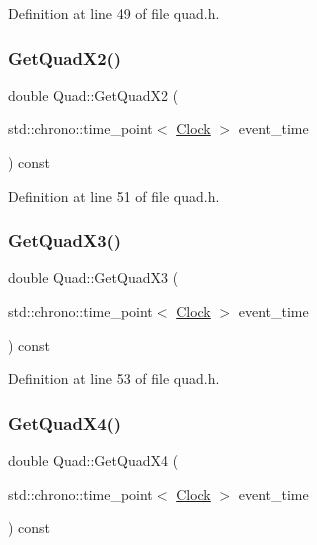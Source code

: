 Definition at line 49 of file quad.\+h.

\mbox{\label{class_quad_a2974623eaf17fe5bef35e8c4638149d6}} 
\subsubsection{\texorpdfstring{Get\+Quad\+X2()}{GetQuadX2()}}
{\footnotesize\ttfamily double Quad\+::\+Get\+Quad\+X2 (\begin{DoxyParamCaption}\item[{std\+::chrono\+::time\+\_\+point$<$ \mbox{\hyperlink{universe_8h_a0ef8d951d1ca5ab3cfaf7ab4c7a6fd80}{Clock}} $>$}]{event\+\_\+time }\end{DoxyParamCaption}) const\hspace{0.3cm}{\ttfamily [inline]}}



Definition at line 51 of file quad.\+h.

\mbox{\label{class_quad_aaa044d9683717efd054d82f553b3337d}} 
\subsubsection{\texorpdfstring{Get\+Quad\+X3()}{GetQuadX3()}}
{\footnotesize\ttfamily double Quad\+::\+Get\+Quad\+X3 (\begin{DoxyParamCaption}\item[{std\+::chrono\+::time\+\_\+point$<$ \mbox{\hyperlink{universe_8h_a0ef8d951d1ca5ab3cfaf7ab4c7a6fd80}{Clock}} $>$}]{event\+\_\+time }\end{DoxyParamCaption}) const\hspace{0.3cm}{\ttfamily [inline]}}



Definition at line 53 of file quad.\+h.

\mbox{\label{class_quad_a07884076387e255aa09ca8b0ac7ff599}} 
\subsubsection{\texorpdfstring{Get\+Quad\+X4()}{GetQuadX4()}}
{\footnotesize\ttfamily double Quad\+::\+Get\+Quad\+X4 (\begin{DoxyParamCaption}\item[{std\+::chrono\+::time\+\_\+point$<$ \mbox{\hyperlink{universe_8h_a0ef8d951d1ca5ab3cfaf7ab4c7a6fd80}{Clock}} $>$}]{event\+\_\+time }\end{DoxyParamCaption}) const\hspace{0.3cm}{\ttfamily [inline]}}



